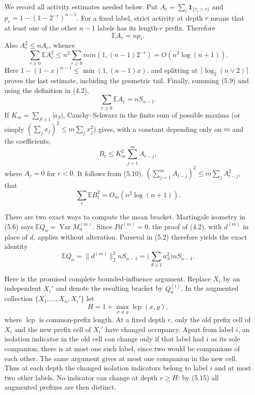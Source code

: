 \documentclass[11pt]{article}
\numberwithin{equation}{section}
\newcommand{\E}{\mathbb E}\newcommand{\Pp}{\mathbb P}
\newcommand{\Var}{\operatorname{Var}}\newcommand{\Cov}{\operatorname{Cov}}
\newcommand{\1}{\mathbf 1}\newcommand{\F}{\mathcal F}\newcommand{\D}{\mathcal D}
\begin{document}
We record all activity estimates needed below.  Put
$A_r=\sum_i{\mathbf 1}_{\{\tau_i>r\}}$ and $p_r=1-(1-2^{-r})^{n-1}$.
For a fixed label, strict activity at depth $r$ means that at least one of
the other $n-1$ labels has its length-$r$ prefix.  Therefore
\begin{equation}
 \E A_r=np_r.                                                 \tag{5.9}
\end{equation}
Also $A_r^2\le nA_r$, whence
\begin{equation}
 \sum_{r\ge0}\E A_r^2\le n^2\sum_{r\ge0}min(1,(n-1)2^{-r})
                         =O(n^2\log(n+1)).                    \tag{5.10}
\end{equation}
Here $1-(1-x)^{n-1}\le\min(1,(n-1)x)$, and splitting at
$\lceil\log_2(n\vee2)\rceil$ proves the last estimate, including the
geometric tail.  Finally, summing (5.9) and using the definition in (4.2),
\begin{equation}
 \sum_{r\ge0}\E A_r=nS_{n-1}.                                \tag{5.11}
\end{equation}
If $K_m=\sum_{S\ni1}|a_S|$, Cauchy--Schwarz in the finite sum of possible
maxima (or simply $(\sum_jx_j)^2\le m\sum_jx_j^2$) gives, with a constant
depending only on $m$ and the coefficients,
\begin{equation}
 B_t\le K_m^2\sum_{j=1}^m A_{t-j},                            \tag{5.12}
\end{equation}
where $A_r=0$ for $r<0$.  It follows from (5.10),
$(\sum_{j=1}^m A_{t-j})^2\le m\sum_jA_{t-j}^2$, that
\begin{equation}
 \sum_t\E B_t^2=O_m(n^2\log(n+1)).                           \tag{5.13}
\end{equation}

There are two exact ways to compute the mean bracket.  Martingale isometry
in (5.6) says $\E Q_n=\Var M_n^{(m)}$.  Since $Pd^{(m)}=0$, the proof of
(4.2), with $d^{(m)}$ in place of $d$, applies without alteration.  Parseval
in (5.2) therefore yields the exact identity
\begin{equation}
 \E Q_n=\|d^{(m)}\|_2^2 nS_{n-1}
       =\Big(\sum_{S\ni1}a_S^2\Big)nS_{n-1}.                 \tag{5.14}
\end{equation}

Here is the promised complete bounded-influence argument.  Replace $X_i$ by
an independent $X_i'$ and denote the resulting bracket by $Q_n^{(i)}$.
In the augmented collection
$\{X_1,\ldots,X_n,X_i'\}$ let
\begin{equation}
 H=1+\max_{x\ne y}\operatorname{lcp}(x,y),                   \tag{5.15}
\end{equation}
where $\operatorname{lcp}$ is common-prefix length.  At a fixed depth $r$,
only the old prefix cell of $X_i$ and the new prefix cell of $X_i'$ have
changed occupancy.  Apart from label $i$, an isolation indicator in the old
cell can change only if that label had $i$ as its sole companion; there is at
most one such label, since two would be companions of each other.  The same
argument gives at most one companion in the new cell.  Thus at each depth
the changed isolation indicators belong to label $i$ and at most two other
labels.  No indicator can change at depth $r\ge H$: by (5.15) all augmented
prefixes are then distinct.
\end{document}
